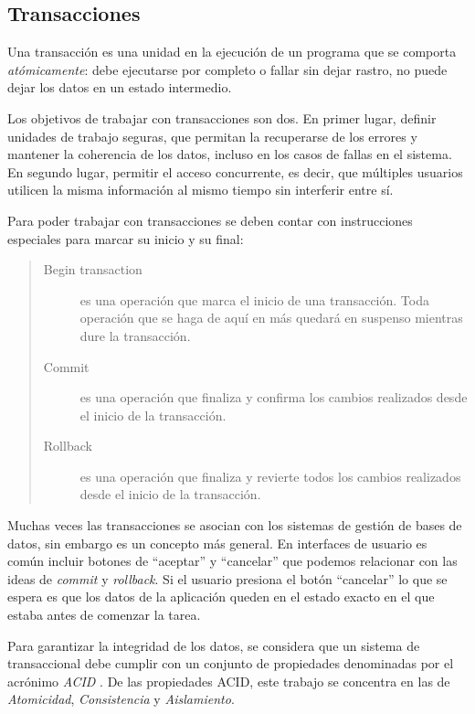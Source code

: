 \subsection{Transacciones}	

Una transacción es una unidad en la ejecución de un programa que se comporta 
\emph{atómicamente}: debe ejecutarse por completo o fallar sin dejar rastro, no
puede dejar los datos en un estado intermedio.

Los objetivos de trabajar con transacciones son dos.
En primer lugar, definir unidades de trabajo seguras, que permitan la
recuperarse de los errores y mantener la coherencia de los datos, incluso en
los casos de fallas en el sistema.
En segundo lugar, permitir el acceso concurrente, es decir, que múltiples
usuarios utilicen la misma información al mismo tiempo sin interferir entre sí.

\medskip
Para poder trabajar con transacciones se deben contar con instrucciones
especiales para marcar su inicio y su final:
\begin{quote}
	\label{ctxTransactional}
	\begin{description}
		\item[Begin transaction] es una operación que marca el inicio de una
		transacción. Toda operación que se haga de aquí en más quedará en suspenso
		mientras dure la transacción.
	
		\item[Commit] es una operación que finaliza y confirma los
		cambios realizados desde el inicio de la transacción. 
		
		\item[Rollback] es una operación que finaliza y revierte todos los cambios
		realizados desde el inicio de la transacción.
	\end{description}
\end{quote}
   
\bigskip

Muchas veces las transacciones se asocian con los sistemas de gestión de bases
de datos, sin embargo es un concepto más general.
En interfaces de usuario es común incluir botones de
``aceptar'' y ``cancelar'' que podemos relacionar con las ideas de
\emph{commit} y \emph{rollback}. 
Si el usuario presiona el botón ``cancelar'' lo que se espera
es que los datos de la aplicación queden en el estado exacto en el que estaba
antes de comenzar la tarea.

\bigskip
\label{sec:ACID}
Para garantizar la integridad de los datos, se considera que un sistema de
transaccional debe cumplir con un conjunto de propiedades denominadas por el
acrónimo \emph{ACID} \cite{HaerderReuter83}.
De las propiedades ACID, este trabajo se concentra en las de \emph{Atomicidad},
\emph{Consistencia} y \emph{Aislamiento}. 

